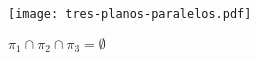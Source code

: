 \begin{figure}[h]
    \centering
    \caption{$\pi_1\cap\pi_2\cap\pi_3 = \emptyset$}
    {\centering\texttt{[image: tres-planos-paralelos.pdf]}}
\end{figure}
